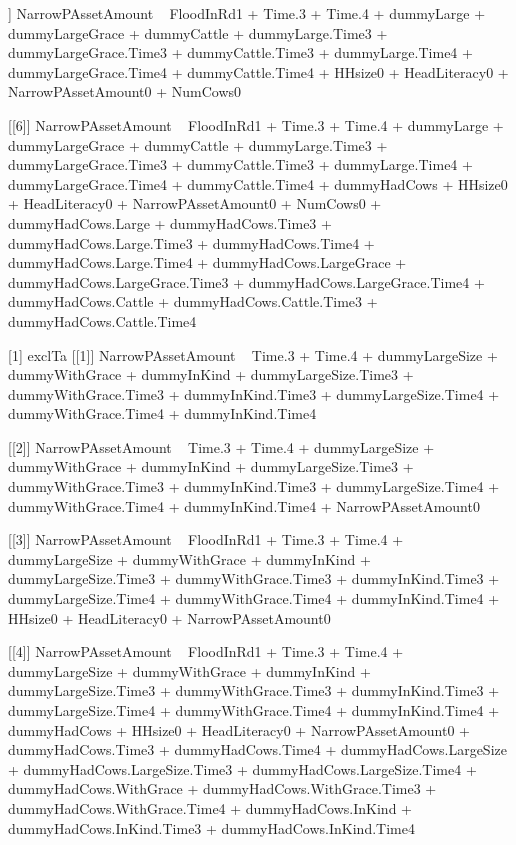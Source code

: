 \begin{Schunk}
\begin{Soutput}
[[5]]
NarrowPAssetAmount ~ FloodInRd1 + Time.3 + Time.4 + dummyLarge + 
    dummyLargeGrace + dummyCattle + dummyLarge.Time3 + dummyLargeGrace.Time3 + 
    dummyCattle.Time3 + dummyLarge.Time4 + dummyLargeGrace.Time4 + 
    dummyCattle.Time4 + HHsize0 + HeadLiteracy0 + NarrowPAssetAmount0 + 
    NumCows0

[[6]]
NarrowPAssetAmount ~ FloodInRd1 + Time.3 + Time.4 + dummyLarge + 
    dummyLargeGrace + dummyCattle + dummyLarge.Time3 + dummyLargeGrace.Time3 + 
    dummyCattle.Time3 + dummyLarge.Time4 + dummyLargeGrace.Time4 + 
    dummyCattle.Time4 + dummyHadCows + HHsize0 + HeadLiteracy0 + 
    NarrowPAssetAmount0 + NumCows0 + dummyHadCows.Large + dummyHadCows.Time3 + 
    dummyHadCows.Large.Time3 + dummyHadCows.Time4 + dummyHadCows.Large.Time4 + 
    dummyHadCows.LargeGrace + dummyHadCows.LargeGrace.Time3 + 
    dummyHadCows.LargeGrace.Time4 + dummyHadCows.Cattle + dummyHadCows.Cattle.Time3 + 
    dummyHadCows.Cattle.Time4

[1] exclTa
[[1]]
NarrowPAssetAmount ~ Time.3 + Time.4 + dummyLargeSize + dummyWithGrace + 
    dummyInKind + dummyLargeSize.Time3 + dummyWithGrace.Time3 + 
    dummyInKind.Time3 + dummyLargeSize.Time4 + dummyWithGrace.Time4 + 
    dummyInKind.Time4

[[2]]
NarrowPAssetAmount ~ Time.3 + Time.4 + dummyLargeSize + dummyWithGrace + 
    dummyInKind + dummyLargeSize.Time3 + dummyWithGrace.Time3 + 
    dummyInKind.Time3 + dummyLargeSize.Time4 + dummyWithGrace.Time4 + 
    dummyInKind.Time4 + NarrowPAssetAmount0

[[3]]
NarrowPAssetAmount ~ FloodInRd1 + Time.3 + Time.4 + dummyLargeSize + 
    dummyWithGrace + dummyInKind + dummyLargeSize.Time3 + dummyWithGrace.Time3 + 
    dummyInKind.Time3 + dummyLargeSize.Time4 + dummyWithGrace.Time4 + 
    dummyInKind.Time4 + HHsize0 + HeadLiteracy0 + NarrowPAssetAmount0

[[4]]
NarrowPAssetAmount ~ FloodInRd1 + Time.3 + Time.4 + dummyLargeSize + 
    dummyWithGrace + dummyInKind + dummyLargeSize.Time3 + dummyWithGrace.Time3 + 
    dummyInKind.Time3 + dummyLargeSize.Time4 + dummyWithGrace.Time4 + 
    dummyInKind.Time4 + dummyHadCows + HHsize0 + HeadLiteracy0 + 
    NarrowPAssetAmount0 + dummyHadCows.Time3 + dummyHadCows.Time4 + 
    dummyHadCows.LargeSize + dummyHadCows.LargeSize.Time3 + dummyHadCows.LargeSize.Time4 + 
    dummyHadCows.WithGrace + dummyHadCows.WithGrace.Time3 + dummyHadCows.WithGrace.Time4 + 
    dummyHadCows.InKind + dummyHadCows.InKind.Time3 + dummyHadCows.InKind.Time4


\end{Soutput}
\end{Schunk}
